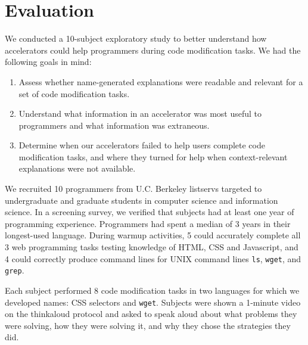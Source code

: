 \section{Evaluation}

We conducted a 10-subject exploratory study to better understand how accelerators could help programmers during code modification tasks.
We had the following goals in mind:
\begin{enumerate}
\item Assess whether \gls{name}-generated explanations were readable and relevant for a set of code modification tasks.
\item Understand what information in an accelerator was most useful to programmers and what information was extraneous.
\item Determine when our accelerators failed to help users complete code modification tasks, and where they turned for help when context-relevant explanations were not available.
\end{enumerate}

We recruited 10 programmers from U.C. Berkeley listservs targeted to undergraduate and graduate students in computer science and information science.
In a screening survey, we verified that subjects had at least one year of programming experience.
Programmers had spent a median of 3 years in their longest-used language.
During warmup activities, 5 could accurately complete all 3 web programming tasks testing knowledge of HTML, CSS and Javascript, and 4 could correctly produce command lines for UNIX command lines \texttt{ls}, \texttt{wget}, and \texttt{grep}.

Each subject performed 8 code modification tasks in two languages for which we developed \glspl{name}: CSS selectors and \texttt{wget}.
Subjects were shown a 1-minute video on the thinkaloud protocol and asked to speak aloud about what problems they were solving, how they were solving it, and why they chose the strategies they did.

